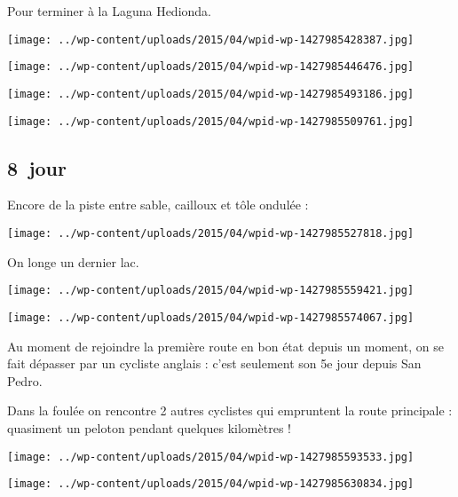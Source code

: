 Pour terminer à la Laguna Hedionda.
\begin{center} \texttt{[image: ../wp-content/uploads/2015/04/wpid-wp-1427985428387.jpg]} \end{center}
\begin{center} \texttt{[image: ../wp-content/uploads/2015/04/wpid-wp-1427985446476.jpg]} \end{center}
\begin{center} \texttt{[image: ../wp-content/uploads/2015/04/wpid-wp-1427985493186.jpg]} \end{center}
\begin{center} \texttt{[image: ../wp-content/uploads/2015/04/wpid-wp-1427985509761.jpg]} \end{center}

 \subsection*{8\ieme\ jour} 

 Encore de la piste entre sable, cailloux et tôle ondulée :
\begin{center} \texttt{[image: ../wp-content/uploads/2015/04/wpid-wp-1427985527818.jpg]} \end{center}

\pagebreak
 On longe un dernier lac.
\begin{center} \texttt{[image: ../wp-content/uploads/2015/04/wpid-wp-1427985559421.jpg]} \end{center}
\begin{center} \texttt{[image: ../wp-content/uploads/2015/04/wpid-wp-1427985574067.jpg]} \end{center}

 Au moment de rejoindre la première route en bon état depuis un moment, on se fait dépasser par un cycliste anglais : c'est seulement son 5e jour depuis San Pedro. 

\pagebreak
 Dans la foulée on rencontre 2 autres cyclistes qui empruntent la route principale : quasiment un peloton pendant quelques kilomètres !
\begin{center} \texttt{[image: ../wp-content/uploads/2015/04/wpid-wp-1427985593533.jpg]} \end{center}
\begin{center} \texttt{[image: ../wp-content/uploads/2015/04/wpid-wp-1427985630834.jpg]} \end{center}

